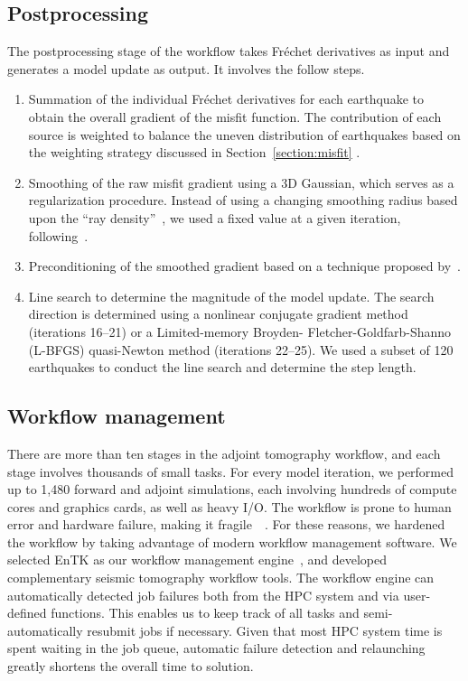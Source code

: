 \documentclass[extra,mreferee]{gji}
\begin{document}
\subsection{Postprocessing}

The postprocessing stage of the workflow takes Fr\'echet derivatives as input and
generates a model update as output.
It involves the follow steps.
\begin{enumerate}
  \item Summation of the individual Fr\'echet derivatives for each earthquake to obtain the overall gradient of the misfit function. The contribution of each source is weighted to balance
    the uneven distribution of earthquakes based on the weighting strategy discussed in Section~\ref{section:misfit} .
  \item Smoothing of the raw misfit gradient using a 3D Gaussian, which
    serves as a regularization procedure. Instead of using a changing
    smoothing radius based upon the ``ray density''~\citep{bozdaug2016global},
    we used a fixed value at a given iteration, following~\cite{zhu2012structure}.
  \item Preconditioning of the smoothed gradient based on a technique proposed by~\cite{luo2013strategies}.
  \item Line search to determine the magnitude of the model update.
  The search direction is determined using a nonlinear conjugate gradient method~\citep{wright1999numerical} (iterations 16--21) or a Limited-memory Broyden- Fletcher-Goldfarb-Shanno (L-BFGS) quasi-Newton method (iterations 22--25).
  We used a subset of 120 earthquakes to conduct the line search and determine the step length.
\end{enumerate}

\subsection{Workflow management}

There are more than ten stages in the adjoint tomography workflow,
and each stage involves thousands of small tasks.
For every model iteration,
we performed up to 1,480 forward and adjoint simulations, each involving hundreds of
compute cores and graphics cards, as well as heavy I/O.
The workflow is prone to human error and hardware failure, making it fragile~~\citep{Lefebvre2018}.
For these reasons, we hardened the workflow by taking advantage of modern
workflow management software.
We selected EnTK as our
workflow management engine~\citep{EnTK2017}, and developed complementary seismic tomography
workflow tools.
The workflow engine can automatically detected job failures both from the
HPC system and via user-defined functions. This enables us to keep track of
all tasks and semi-automatically resubmit jobs if necessary.
Given that most HPC system time is spent waiting in the job queue, automatic
failure detection and relaunching greatly shortens the overall time to solution.
\end{document}
